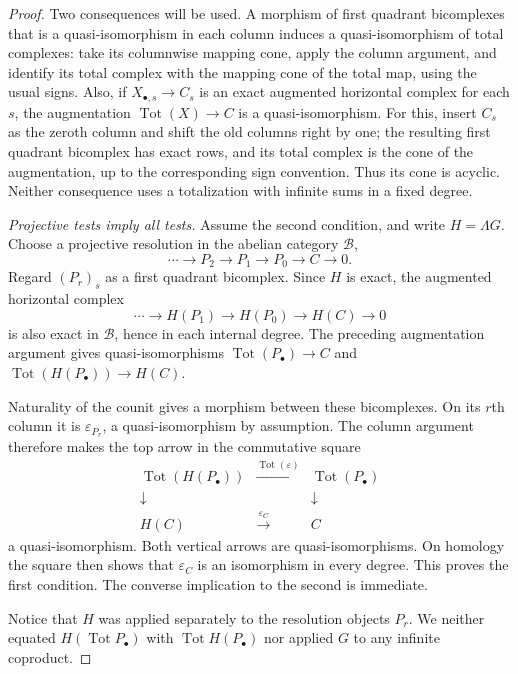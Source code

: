 \begin{proof}
Two consequences will be used.  A morphism of first quadrant
bicomplexes that is a quasi-isomorphism in each column induces a
quasi-isomorphism of total complexes: take its columnwise mapping
cone, apply the column argument, and identify its total complex with
the mapping cone of the total map, using the usual signs.  Also, if
$X_{\bullet,s}\to C_s$ is an exact augmented horizontal complex for
each $s$, the augmentation
$\operatorname{Tot}(X)\to C$ is a quasi-isomorphism.  For this, insert
$C_s$ as the zeroth column and shift the old columns right by one;
the resulting first quadrant bicomplex has exact rows, and its total
complex is the cone of the augmentation, up to the corresponding
sign convention.  Thus its cone is acyclic.  Neither consequence
uses a totalization with infinite sums in a fixed degree.

\emph{Projective tests imply all tests.}
Assume the second condition, and write $H=\Lambda G$.  Choose a
projective resolution in the abelian category $\mathcal B$,
\[
 \cdots\longrightarrow P_2\longrightarrow P_1
       \longrightarrow P_0\longrightarrow C\longrightarrow0 .
\]
Regard $(P_r)_s$ as a first quadrant bicomplex.  Since $H$ is exact,
the augmented horizontal complex
\[
 \cdots\longrightarrow H(P_1)\longrightarrow H(P_0)
       \longrightarrow H(C)\longrightarrow0
\]
is also exact in $\mathcal B$, hence in each internal degree.
The preceding augmentation argument gives quasi-isomorphisms
$\operatorname{Tot}(P_\bullet)\to C$ and
$\operatorname{Tot}(H(P_\bullet))\to H(C)$.

Naturality of the counit gives a morphism between these bicomplexes.
On its $r$th column it is $\varepsilon_{P_r}$, a quasi-isomorphism by
assumption. The column argument therefore makes the top arrow in
the commutative square
\[
\begin{array}{ccc}
 \operatorname{Tot}(H(P_\bullet))&
       \xrightarrow{\operatorname{Tot}(\varepsilon)}&
                         \operatorname{Tot}(P_\bullet)\\
 \downarrow&&\downarrow\\
 H(C)&\xrightarrow{\varepsilon_C}&C
\end{array}
\]
a quasi-isomorphism.  Both vertical arrows are quasi-isomorphisms.
On homology the square then shows that $\varepsilon_C$ is an
isomorphism in every degree.  This proves the first condition.  The
converse implication to the second is immediate.

Notice that $H$ was applied separately to the resolution objects
$P_r$.  We neither equated $H(\operatorname{Tot}P_\bullet)$ with
$\operatorname{Tot}H(P_\bullet)$ nor applied $G$ to any infinite
coproduct.


\end{proof}
